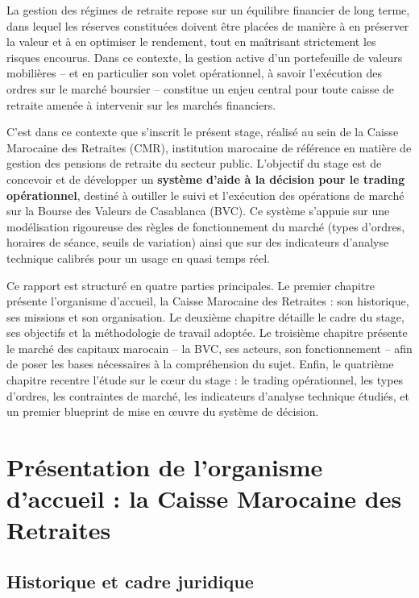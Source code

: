 \documentclass{rapportENSIAS} %
\begin{document}
\noindent
La gestion des régimes de retraite repose sur un équilibre financier de long terme, dans lequel les réserves constituées doivent être placées de manière à en préserver la valeur et à en optimiser le rendement, tout en maîtrisant strictement les risques encourus. Dans ce contexte, la gestion active d'un portefeuille de valeurs mobilières -- et en particulier son volet opérationnel, à savoir l'exécution des ordres sur le marché boursier -- constitue un enjeu central pour toute caisse de retraite amenée à intervenir sur les marchés financiers.

\vspace{0.3cm}
\noindent
C'est dans ce contexte que s'inscrit le présent stage, réalisé au sein de la Caisse Marocaine des Retraites (CMR), institution marocaine de référence en matière de gestion des pensions de retraite du secteur public. L'objectif du stage est de concevoir et de développer un \textbf{système d'aide à la décision pour le trading opérationnel}, destiné à outiller le suivi et l'exécution des opérations de marché sur la Bourse des Valeurs de Casablanca (BVC). Ce système s'appuie sur une modélisation rigoureuse des règles de fonctionnement du marché (types d'ordres, horaires de séance, seuils de variation) ainsi que sur des indicateurs d'analyse technique calibrés pour un usage en quasi temps réel.

\vspace{0.3cm}
\noindent
Ce rapport est structuré en quatre parties principales. Le premier chapitre présente l'organisme d'accueil, la Caisse Marocaine des Retraites : son historique, ses missions et son organisation. Le deuxième chapitre détaille le cadre du stage, ses objectifs et la méthodologie de travail adoptée. Le troisième chapitre présente le marché des capitaux marocain -- la BVC, ses acteurs, son fonctionnement -- afin de poser les bases nécessaires à la compréhension du sujet. Enfin, le quatrième chapitre recentre l'étude sur le c\oe ur du stage : le trading opérationnel, les types d'ordres, les contraintes de marché, les indicateurs d'analyse technique étudiés, et un premier blueprint de mise en \oe uvre du système de décision.

\chapter{Présentation de l'organisme d'accueil : la Caisse Marocaine des Retraites}

\section{Historique et cadre juridique}
\end{document}
